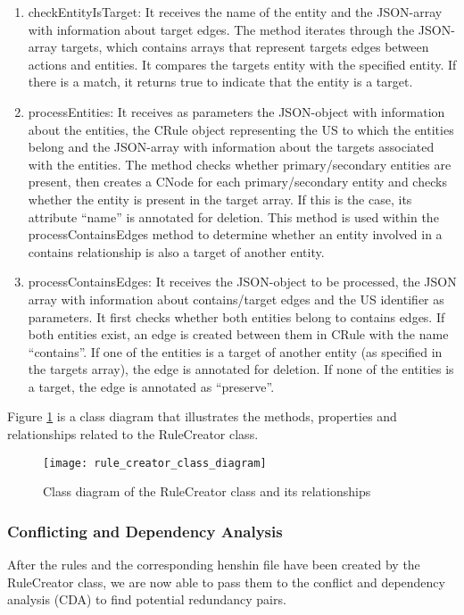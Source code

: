 \begin{enumerate}
	\item checkEntityIsTarget: It receives the name of the entity and the JSON-array with information about target edges. The method iterates through the JSON-array targets, which contains arrays that represent targets edges between actions and entities. It compares the targets entity with the specified entity. If there is a match, it returns true to indicate that the entity is a target.
	
	\item processEntities: It receives as parameters the JSON-object with information about the entities, the CRule object representing the US to which the entities belong and the JSON-array with information about the targets associated with the entities. The method checks whether primary/secondary entities are present, then creates a CNode for each primary/secondary entity and checks whether the entity is present in the target array. If this is the case, its attribute \enquote{name} is annotated for deletion. This method is used within the processContainsEdges method to determine whether an entity involved in a contains relationship is also a target of another entity.
	
	\item processContainsEdges: It receives the JSON-object to be processed, the JSON array with information about contains/target edges and the US identifier as parameters. It first checks whether both entities belong to contains edges. If both entities exist, an edge is created between them in CRule with the name \enquote{contains}. If one of the entities is a target of another entity (as specified in the targets array), the edge is annotated for deletion. If none of the entities is a target, the edge is annotated as \enquote{preserve}.
	
\end{enumerate}
Figure \ref{fig:rule_creator_class_diagram} is a class diagram that illustrates the methods, properties and relationships related to the RuleCreator class.

\begin{figure}[h]
	\centering
	\texttt{[image: rule\_creator\_class\_diagram]}
	\caption{Class diagram of the RuleCreator class and its relationships}\label{fig:rule_creator_class_diagram}
\end{figure}
\subsubsection*{Conflicting and Dependency Analysis}
After the rules and the corresponding henshin file have been created by the RuleCreator class, we are now able to pass them to the conflict and dependency analysis (CDA) to find potential redundancy pairs.

